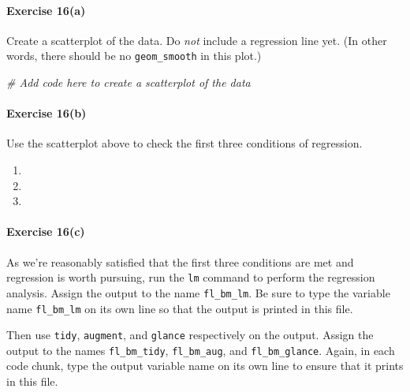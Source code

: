 \documentclass[
]{book}
\newenvironment{Shaded}{\begin{snugshade}}{\end{snugshade}}
\newcommand{\CommentTok}[1]{\textcolor[rgb]{0.56,0.35,0.01}{\textit{#1}}}
\providecommand{\tightlist}{%
  \setlength{\itemsep}{0pt}\setlength{\parskip}{0pt}}
\begin{document}
\hypertarget{exercise-16a}{%
\paragraph*{Exercise 16(a)}\label{exercise-16a}}

Create a scatterplot of the data. Do \emph{not} include a regression line yet. (In other words, there should be no \texttt{geom\_smooth} in this plot.)

\begin{Shaded}
\begin{Highlighting}[]
\CommentTok{\# Add code here to create a scatterplot of the data}
\end{Highlighting}
\end{Shaded}

\hypertarget{exercise-16b}{%
\paragraph*{Exercise 16(b)}\label{exercise-16b}}

Use the scatterplot above to check the first three conditions of regression.

\begin{enumerate}
\def\labelenumi{\arabic{enumi}.}
\tightlist
\item
\item
\item
\end{enumerate}

\hypertarget{exercise-16c}{%
\paragraph*{Exercise 16(c)}\label{exercise-16c}}

As we're reasonably satisfied that the first three conditions are met and regression is worth pursuing, run the \texttt{lm} command to perform the regression analysis. Assign the output to the name \texttt{fl\_bm\_lm}. Be sure to type the variable name \texttt{fl\_bm\_lm} on its own line so that the output is printed in this file.

Then use \texttt{tidy}, \texttt{augment}, and \texttt{glance} respectively on the output. Assign the output to the names \texttt{fl\_bm\_tidy}, \texttt{fl\_bm\_aug}, and \texttt{fl\_bm\_glance}. Again, in each code chunk, type the output variable name on its own line to ensure that it prints in this file.
\end{document}
